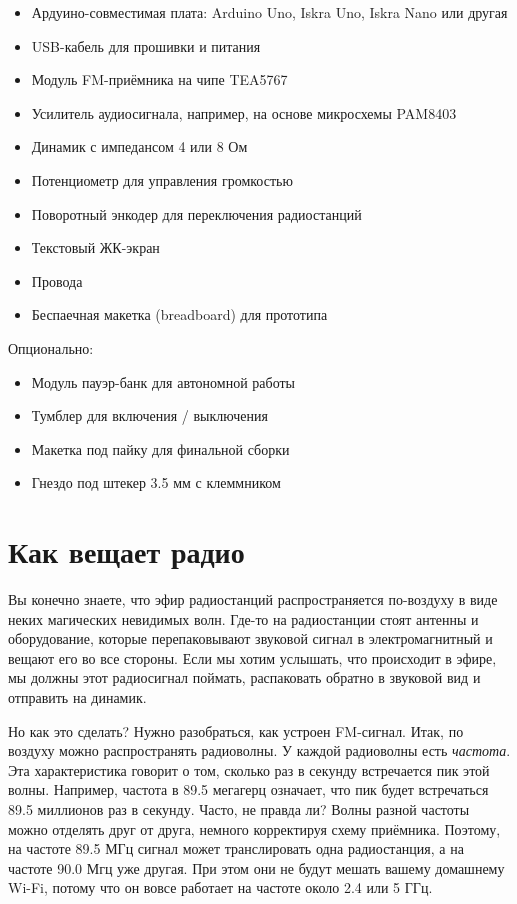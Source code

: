 
\begin{itemize}
  \item Ардуино-совместимая плата: Arduino Uno, Iskra Uno, Iskra Nano или другая
  \item USB-кабель для прошивки и питания
  \item Модуль FM-приёмника на чипе TEA5767
  \item Усилитель аудиосигнала, например, на основе микросхемы PAM8403
  \item Динамик с импедансом 4 или 8 Ом
  \item Потенциометр для управления громкостью
  \item Поворотный энкодер для переключения радиостанций
  \item Текстовый ЖК-экран
  \item Провода
  \item Беспаечная макетка (breadboard) для прототипа
\end{itemize}

Опционально:

\begin{itemize}
  \item Модуль пауэр-банк для автономной работы
  \item Тумблер для включения / выключения
  \item Макетка под пайку для финальной сборки
  \item Гнездо под штекер 3.5 мм с клеммником
\end{itemize}

\section{Как вещает радио}

Вы конечно знаете, что эфир радиостанций распространяется по-воздуху в виде неких магических невидимых волн. Где-то на радиостанции стоят антенны и оборудование, которые перепаковывают звуковой сигнал в электромагнитный и вещают его во все стороны. Если мы хотим услышать, что происходит в эфире, мы должны этот радиосигнал поймать, распаковать обратно в звуковой вид и отправить на динамик.

Но как это сделать? Нужно разобраться, как устроен FM-сигнал. Итак, по воздуху можно распространять радиоволны. У каждой радиоволны есть \emph{частота}. Эта характеристика говорит о том, сколько раз в секунду встречается пик этой волны. Например, частота в 89.5 мегагерц означает, что пик будет встречаться 89.5 миллионов раз в секунду. Часто, не правда
ли? Волны разной частоты можно отделять друг от друга, немного корректируя схему приёмника. Поэтому, на частоте 89.5 МГц сигнал может транслировать одна радиостанция, а на частоте 90.0 Мгц уже другая. При этом они не будут мешать вашему домашнему Wi-Fi, потому что он вовсе работает на частоте около 2.4 или 5 ГГц.


